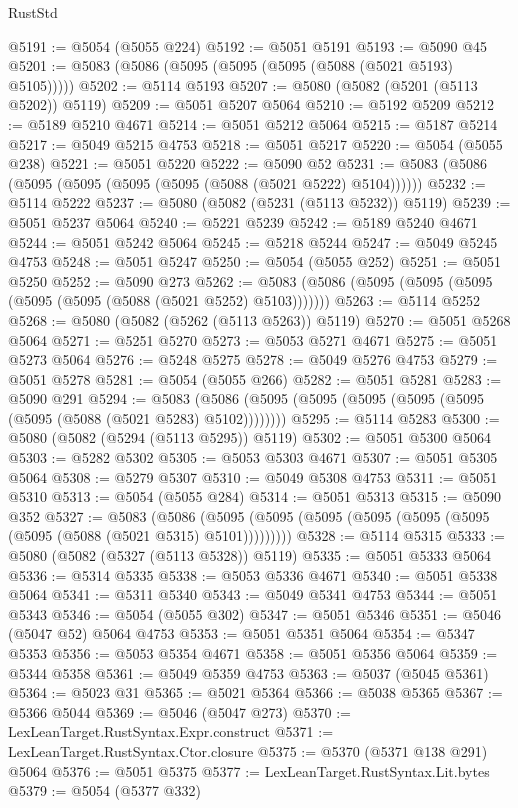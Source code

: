 \begin{lexlean}{RustStd}
\begin{coremodule}
@5191 := @5054 (@5055 @224)
@5192 := @5051 @5191
@5193 := @5090 @45
@5201 := @5083 (@5086 (@5095 (@5095 (@5095 (@5088 (@5021 @5193) @5105)))))
@5202 := @5114 @5193
@5207 := @5080 (@5082 (@5201 (@5113 @5202)) @5119)
@5209 := @5051 @5207 @5064
@5210 := @5192 @5209
@5212 := @5189 @5210 @4671
@5214 := @5051 @5212 @5064
@5215 := @5187 @5214
@5217 := @5049 @5215 @4753
@5218 := @5051 @5217
@5220 := @5054 (@5055 @238)
@5221 := @5051 @5220
@5222 := @5090 @52
@5231 := @5083 (@5086 (@5095 (@5095 (@5095 (@5095 (@5088 (@5021 @5222) @5104))))))
@5232 := @5114 @5222
@5237 := @5080 (@5082 (@5231 (@5113 @5232)) @5119)
@5239 := @5051 @5237 @5064
@5240 := @5221 @5239
@5242 := @5189 @5240 @4671
@5244 := @5051 @5242 @5064
@5245 := @5218 @5244
@5247 := @5049 @5245 @4753
@5248 := @5051 @5247
@5250 := @5054 (@5055 @252)
@5251 := @5051 @5250
@5252 := @5090 @273
@5262 := @5083 (@5086 (@5095 (@5095 (@5095 (@5095 (@5095 (@5088 (@5021 @5252) @5103)))))))
@5263 := @5114 @5252
@5268 := @5080 (@5082 (@5262 (@5113 @5263)) @5119)
@5270 := @5051 @5268 @5064
@5271 := @5251 @5270
@5273 := @5053 @5271 @4671
@5275 := @5051 @5273 @5064
@5276 := @5248 @5275
@5278 := @5049 @5276 @4753
@5279 := @5051 @5278
@5281 := @5054 (@5055 @266)
@5282 := @5051 @5281
@5283 := @5090 @291
@5294 := @5083 (@5086 (@5095 (@5095 (@5095 (@5095 (@5095 (@5095 (@5088 (@5021 @5283) @5102))))))))
@5295 := @5114 @5283
@5300 := @5080 (@5082 (@5294 (@5113 @5295)) @5119)
@5302 := @5051 @5300 @5064
@5303 := @5282 @5302
@5305 := @5053 @5303 @4671
@5307 := @5051 @5305 @5064
@5308 := @5279 @5307
@5310 := @5049 @5308 @4753
@5311 := @5051 @5310
@5313 := @5054 (@5055 @284)
@5314 := @5051 @5313
@5315 := @5090 @352
@5327 := @5083
    (@5086 (@5095 (@5095 (@5095 (@5095 (@5095 (@5095 (@5095 (@5088 (@5021 @5315) @5101)))))))))
@5328 := @5114 @5315
@5333 := @5080 (@5082 (@5327 (@5113 @5328)) @5119)
@5335 := @5051 @5333 @5064
@5336 := @5314 @5335
@5338 := @5053 @5336 @4671
@5340 := @5051 @5338 @5064
@5341 := @5311 @5340
@5343 := @5049 @5341 @4753
@5344 := @5051 @5343
@5346 := @5054 (@5055 @302)
@5347 := @5051 @5346
@5351 := @5046 (@5047 @52) @5064 @4753
@5353 := @5051 @5351 @5064
@5354 := @5347 @5353
@5356 := @5053 @5354 @4671
@5358 := @5051 @5356 @5064
@5359 := @5344 @5358
@5361 := @5049 @5359 @4753
@5363 := @5037 (@5045 @5361)
@5364 := @5023 @31
@5365 := @5021 @5364
@5366 := @5038 @5365
@5367 := @5366 @5044
@5369 := @5046 (@5047 @273)
@5370 := LexLeanTarget.RustSyntax.Expr.construct
@5371 := LexLeanTarget.RustSyntax.Ctor.closure
@5375 := @5370 (@5371 @138 @291) @5064
@5376 := @5051 @5375
@5377 := LexLeanTarget.RustSyntax.Lit.bytes
@5379 := @5054 (@5377 @332)

\end{coremodule}
\end{lexlean}
